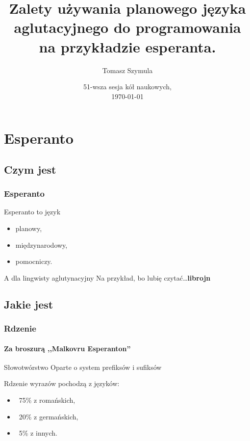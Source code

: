 \documentclass{beamer}
\title[Esperanto w programowaniu]{Zalety używania planowego języka aglutacyjnego do programowania na przykładzie esperanta.}
\author{Tomasz Szymula}
\institute[PEJ]{Koło naukowe Blabel, AGH}
\date[2014]{51-wsza sesja kół naukowych,\\ \today}
\begin{document}
  \frame{\titlepage}
 
  \section{Esperanto}
  \subsection{Czym jest} 
  
  \begin{frame}
  	\frametitle{Esperanto}
  	
  	\begin{block}{Esperanto to język}
  		\begin{itemize}
  			\item planowy,
			\item międzynarodowy,
			\item pomocniczy.
		\end{itemize}
  	\end{block}
  	
  	\pause

	\begin{block}{A dla lingwisty aglutynacyjny}
		Na przykład, bo lubię czytać\dots \textbf{\textcolor{antiquefuchsia}{libr}o\textcolor{ao(english)}{j}\textcolor{blue(pigment)}{n}}
	\end{block}  	
  	
  \end{frame}
 
  
  
  \subsection{Jakie jest}
  
  \begin{frame}
  	\frametitle{Rdzenie}
  	\framesubtitle{Za broszurą ,,Malkovru Esperanton''}
  	
  	\begin{block}{Słowotwórstwo}
  		Oparte o system prefiksów i sufiksów
  	\end{block}
	Rdzenie wyrazów pochodzą z języków:
	\begin{itemize}
		\item ~75\% z romańskich,
		\item ~20\% z germańskich,
		\item ~5\% z innych.
	\end{itemize}
		
  \end{frame}
  
\end{document}
